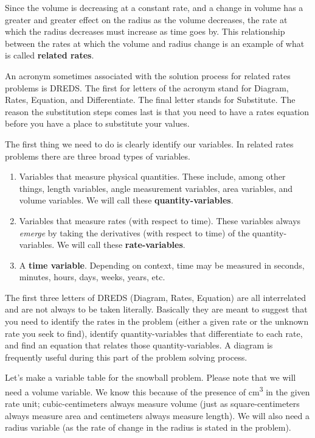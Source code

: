 \documentclass[12pt,]{book}
\newcommand{\terminology}[1]{\textbf{#1}}
\newcommand{\acronym}[1]{#1}
\theoremstyle{plain}
\theoremstyle{definition}
\numberwithin{equation}{section}
\begin{document}
\par
Since the volume is decreasing at a constant rate, and a change in volume has a greater and greater effect on the radius as the volume decreases, the rate at which the radius decreases must increase as time goes by. This relationship between the rates at which the volume and radius change is an example of what is called \terminology{related rates}.%
\par
An acronym sometimes associated with the solution process for related rates problems is \acronym{DREDS}. The first for letters of the acronym stand for Diagram, Rates, Equation, and Differentiate. The final letter stands for Substitute. The reason the substitution steps comes last is that you need to have a rates equation before you have a place to substitute your values.%
\par
The first thing we need to do is clearly identify our variables. In related rates problems there are three broad types of variables.%
\begin{enumerate}
\item{}Variables that measure physical quantities. These include, among other things, length variables, angle measurement variables, area variables, and volume variables. We will call these \terminology{quantity-variables}.\item{}Variables that measure rates (with respect to time). These variables always \emph{emerge} by taking the derivatives (with respect to time) of the quantity-variables. We will call these \terminology{rate-variables}.\item{}A \terminology{time variable}. Depending on context, time may be measured in seconds, minutes, hours, days, weeks, years, etc.\@\end{enumerate}
\par
The first three letters of \acronym{DREDS} (Diagram, Rates, Equation) are all interrelated and are not always to be taken literally. Basically they are meant to suggest that you need to identify the rates in the problem (either a given rate or the unknown rate you seek to find), identify quantity-variables that differentiate to each rate, and find an equation that relates those quantity-variables. A diagram is frequently useful during this part of the problem solving process.%
\par
Let's make a variable table for the snowball problem. Please note that we will need a volume variable. We know this because of the presence of \si{\centi\meter\tothe{3}} in the given rate unit; cubic-centimeters always measure volume (just as square-centimeters always measure area and centimeters always measure length). We will also need a radius variable (as the rate of change in the radius is stated in the problem).%
\end{document}
